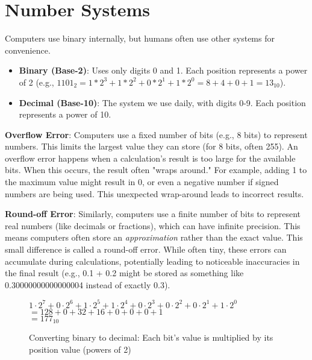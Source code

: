 \documentclass[11pt,oneside]{book}
\begin{document}
\section{Number Systems}
\label{sec:number_systems}
Computers use binary internally, but humans often use other systems for convenience.
\begin{itemize}
    \item \textbf{Binary (Base-2)}: Uses only digits 0 and 1. Each position represents a power of 2 (e.g., $1101_2 = 1*2^3 + 1*2^2 + 0*2^1 + 1*2^0 = 8 + 4 + 0 + 1 = 13_{10}$).
    \item \textbf{Decimal (Base-10)}: The system we use daily, with digits 0-9. Each position represents a power of 10.
\end{itemize}

\textbf{Overflow Error}: Computers use a fixed number of bits (e.g., 8 bits) to represent numbers. This limits the largest value they can store (for 8 bits, often 255). An overflow error happens when a calculation's result is too large for the available bits. When this occurs, the result often "wraps around." For example, adding 1 to the maximum value might result in 0, or even a negative number if signed numbers are being used. This unexpected wrap-around leads to incorrect results.

\textbf{Round-off Error}: Similarly, computers use a finite number of bits to represent real numbers (like decimals or fractions), which can have infinite precision. This means computers often store an \textit{approximation} rather than the exact value. This small difference is called a round-off error. While often tiny, these errors can accumulate during calculations, potentially leading to noticeable inaccuracies in the final result (e.g., 0.1 + 0.2 might be stored as something like 0.30000000000000004 instead of exactly 0.3).

\begin{figure}[h!]
    \centering
    
    \vspace{1em}
    $1 \cdot 2^7 + 0 \cdot 2^6 + 1 \cdot 2^5 + 1 \cdot 2^4 + 0 \cdot 2^3 + 0 \cdot 2^2 + 0 \cdot 2^1 + 1 \cdot 2^0$\\
    $= 128 + 0 + 32 + 16 + 0 + 0 + 0 + 1$\\
    $= 177_{10}$
    
    \caption{Converting binary to decimal: Each bit's value is multiplied by its position value (powers of 2)}
    \label{fig:binary-byte}
\end{figure}
\end{document}
